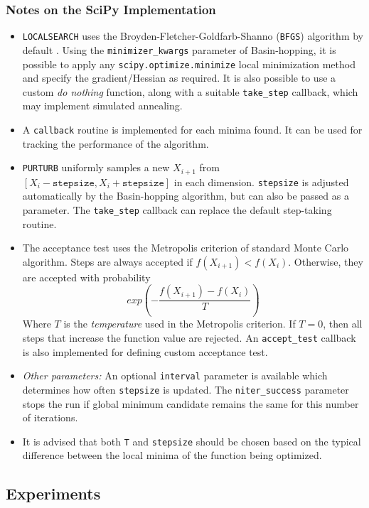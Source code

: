 \documentclass[conference]{IEEEtran}
\begin{document}
\subsubsection{Notes on the SciPy Implementation}

\begin{itemize}
	\item \texttt{LOCALSEARCH} uses the Broyden-Fletcher-Goldfarb-Shanno (\texttt{BFGS}) algorithm by default \cite{b13}. Using the \texttt{minimizer\_kwargs} parameter of Basin-hopping, it is possible to apply any \texttt{scipy.optimize.minimize} local minimization method and specify the gradient/Hessian as required. It is also possible to use a custom \textit{do nothing} function, along with a suitable \texttt{take\_step} callback, which may implement simulated annealing.
	\item A \texttt{callback} routine is implemented for each minima found. It can be used for tracking the performance of the algorithm.
	\item \texttt{PURTURB} uniformly samples a new $X_{i+1}$ from $[X_{i}-\texttt{stepsize}, X_{i}+\texttt{stepsize}]$ in each dimension. \texttt{stepsize} is adjusted automatically by the Basin-hopping algorithm, but can also be passed as a parameter. The \texttt{take\_step} callback can replace the default step-taking routine.
	\item The acceptance test uses the Metropolis criterion of standard Monte Carlo algorithm. Steps are always accepted if $f(X_{i+1}) < f(X_i)$. Otherwise, they are accepted with probability 
	$$exp( -\frac{f(X_{i+1}) - f(X_i)}{T} )$$
	Where $T$ is the \textit{temperature} used in the Metropolis criterion. If $T=0$, then all steps that increase the function value are rejected. An \texttt{accept\_test} callback is also implemented for defining custom acceptance test.
	\item \textit{Other parameters:} An optional \texttt{interval} parameter is available which determines how often \texttt{stepsize} is updated. The \texttt{niter\_success} parameter stops the run if global minimum candidate remains the same for this number of iterations.
	\item It is advised that both \texttt{T} and \texttt{stepsize} should be chosen based on the typical difference between the local minima of the function being optimized.
\end{itemize}

\subsection{Experiments}
\end{document}
